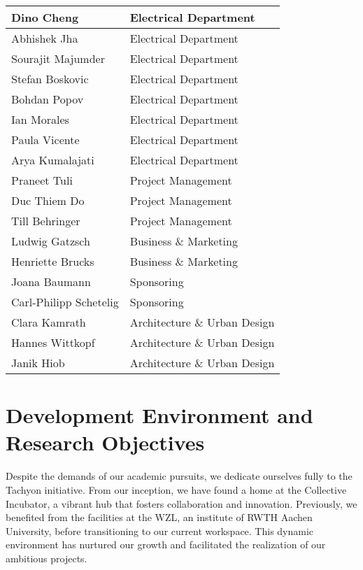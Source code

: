 \begin{table}[H]
\begin{minipage}{0.45\textwidth}
\begin{tabular}{|l|l|}
Dino Cheng              & Electrical Department      \\ \hline
Abhishek Jha            & Electrical Department      \\ \hline
Sourajit Majumder       & Electrical Department      \\ \hline
Stefan Boskovic         & Electrical Department      \\ \hline
Bohdan Popov            & Electrical Department      \\ \hline
Ian Morales             & Electrical Department      \\ \hline
Paula Vicente           & Electrical Department      \\ \hline
Arya Kumalajati        & Electrical Department      \\ \hline
Praneet Tuli            & Project Management         \\ \hline
Duc Thiem Do            & Project Management         \\ \hline
Till Behringer          & Project Management         \\ \hline
Ludwig Gatzsch          & Business \& Marketing      \\ \hline
Henriette Brucks        & Business \& Marketing      \\ \hline
Joana Baumann           & Sponsoring                 \\ \hline
Carl-Philipp Schetelig  & Sponsoring                 \\ \hline
Clara Kamrath           & Architecture \& Urban Design \\ \hline
Hannes Wittkopf         & Architecture \& Urban Design \\ \hline
Janik Hiob              & Architecture \& Urban Design \\ \hline
\end{tabular}
\label{tab:right}
\end{minipage}
\end{table}


\section{Development Environment and Research Objectives}
Despite the demands of our academic pursuits, we dedicate ourselves fully to the Tachyon initiative. From our inception, we have found a home at the Collective Incubator, a vibrant hub that fosters collaboration and innovation. Previously, we benefited from the facilities at the WZL, an institute of RWTH Aachen University, before transitioning to our current workspace. This dynamic environment has nurtured our growth and facilitated the realization of our ambitious projects.

